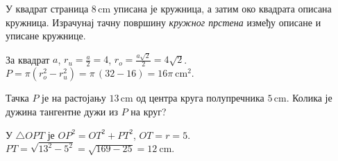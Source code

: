 \documentclass[11pt,a5paper,twoside,addpoints,answers]{exam} %
\newcommand{\measure}[2]{#1\,\mathrm{#2}}
\newcommand{\variant}[3]{#1}
\begin{document}
\begin{questions}
\question[4]
\variant{
У квадрат страница $\measure{8}{cm}$ уписана је кружница, а затим око квадрата описана кружница.
Израчунај тачну површину \emph{кружног прстена} између описане и уписане кружнице.
}{
У једнакостранични троугао страница $\measure{6}{cm}$ уписана је кружница, а затим описана кружница.
Израчунај тачну површину \emph{кружног прстена} између њих.
}{
Правоугаоник има странице $\measure{6}{cm}$ и $\measure{8}{cm}$.
Уписана и описана кружница не постоје обе; зато израчунај \emph{тачну} површину круга чији је пречник једнак дужини дијагонале тог правоугаоника.
}
\begin{solution}[\stretch 4]
\variant{
За квадрат $a$, $r_u=\tfrac a2=4$, $r_o=\tfrac{a\sqrt2}{2}=4\sqrt2$.
$P=\pi(r_o^2-r_u^2)=\pi\,(32-16)=16\pi\ \mathrm{cm}^2$.
}{
За једнакостранични троугао $a$, $r_u=\tfrac{a\sqrt3}{6}$, $r_o=\tfrac{a\sqrt3}{3}$.
За $a=6$: $r_u=\sqrt3$, $r_o=2\sqrt3$.
$P=\pi( (2\sqrt3)^2-(\sqrt3)^2 )=\pi(12-3)=9\pi\ \mathrm{cm}^2$.
}{
Дијагонала: $d=\sqrt{6^2+8^2}=10$ (Питагорина).
Круг са пречником $d$ има полупречник $5$, па је $P=25\pi\ \mathrm{cm}^2$.
}
\end{solution}

\ifprintanswers\else\newpage\fi

\question[3]
\variant{
Тачка $P$ је на растојању $\measure{13}{cm}$ од центра круга полупречника $\measure{5}{cm}$.
Колика је дужина тангентне дужи из $P$ на круг?
}{
Полупречник круга је $\measure{10}{cm}$. Израчунај дужину лука од $\,\measure{25}{cm}$ у степенима (централни угао).
}{
Полупречник круга је $\measure{6}{cm}$. Нађи површину круга \emph{приближно} ($\pi\approx3{,}14$).
}
\begin{solution}[\stretch 2]
\variant{
У $\triangle OPT$ је $OP^2=OT^2+PT^2$, $OT=r=5$.
$PT=\sqrt{13^2-5^2}=\sqrt{169-25}=12\ \mathrm{cm}$.
}{
$l=\dfrac{\alpha}{360^\circ}\cdot 2\pi r\Rightarrow
\alpha=\dfrac{360^\circ\,l}{2\pi r}
=\dfrac{360\cdot 25}{20\pi}
=\dfrac{450}{\pi}^\circ\approx 143{,}24^\circ.$
}{
$P=r^2\pi=36\cdot 3{,}14=113{,}04\ \mathrm{cm}^2$.
}
\end{solution}

\end{questions}
\end{document}
